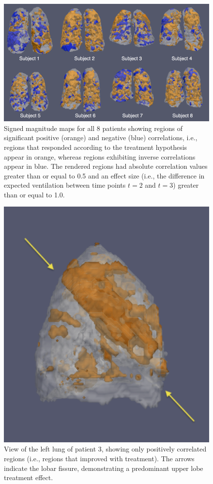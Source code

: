 \documentclass[11pt,]{article}
\begin{document}
\begin{figure}[htbp]
\centering
\includegraphics{Figures/3Dcorrelations.png}
\caption{Signed magnitude maps for all 8 patients showing regions of
significant positive (orange) and negative (blue) correlations, i.e.,
regions that responded according to the treatment hypothesis appear in
orange, whereas regions exhibiting inverse correlations appear in blue.
The rendered regions had absolute correlation values greater than or
equal to 0.5 and an effect size (i.e., the difference in expected
ventilation between time points \(t=2\) and \(t=3\)) greater than or
equal to 1.0.}
\end{figure}



\begin{figure}[htbp]
\centering
\includegraphics{Figures/subject3_stillframe63_lobe.png}
\caption{View of the left lung of patient 3, showing only positively
correlated regions (i.e., regions that improved with treatment). The
arrows indicate the lobar fissure, demonstrating a predominant upper
lobe treatment effect.}
\end{figure}
\end{document}
